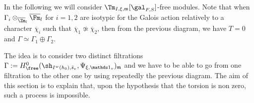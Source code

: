 \begin{iremark}
In the following we will consider $\Tm_{I,\xi,\mathfrak m}[\gal_{F,S}]$-free modules.
Note that
when $\Gamma_i \otimes_{\overline \Zm_l} \overline \Fm_l$ for $i=1,2$
are isotypic for the Galois action relatively to a character $\overline \chi_i$
such that $\overline \chi_1 \not \simeq \overline \chi_2$, then from the
previous diagram, we have $T=0$ and
$\Gamma \simeq \Gamma_1 \oplus \Gamma_2$.
\end{iremark}

The idea is to consider two distinct filtrations
$\Gamma:=H^0_{\free}(\sh_{I^w(h_0),\bar s_v},\Psi_{\xi,\mathds 1_v})_{\mathfrak m}$ and
we have to be able to go from one filtration to the other one by using
repeatedly the previous diagram.
The aim of this section is to explain that, upon the hypothesis that the
torsion is non zero, such a process is impossible.

